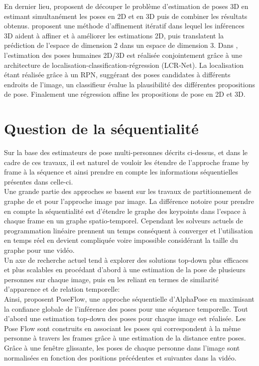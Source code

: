 En dernier lieu, \cite{simo2013joint} proposent de découper le problème d'estimation de poses 3D en estimant simultanément les poses en 2D et en 3D puis de combiner les résultats obtenus. \cite{tome2017lifting} proposent une méthode d'affinement itératif dans lequel les inférences 3D aident à affiner et à améliorer les estimations 2D, puis translatent la prédiction de l'espace de dimension 2 dans un espace de dimension 3. Dans \cite{rogez2019lcr}, l'estimation des poses humaines 2D/3D est réalisée conjointement grâce à une architecture de localisation-classification-régression (LCR-Net). La localisation étant réalisée grâce à un RPN, suggérant des poses candidates à différents endroits de l'image, un classifieur évalue la plausibilité des différentes propositions de pose. Finalement une régression affine les propositions de pose en 2D et 3D.

\section{Question de la séquentialité}
Sur la base des estimateurs de pose multi-personnes décrits ci-dessus, et dans le cadre de ces travaux, il est naturel de vouloir les étendre de l'approche frame by frame à la séquence et ainsi prendre en compte les informations séquentielles présentes dans celle-ci.\\

Une grande partie des approches se basent sur les travaux de partitionnement de graphe de \cite{2015arXiv151106645P} et \cite{2016arXiv160503170I} pour l'approche image par image. La différence notoire pour prendre en compte la séquentialité est d'étendre le graphe des keypoints dans l'espace à chaque frame en un graphe spatio-temporel. Cependant les solveurs actuels de programmation linéaire prennent un temps conséquent à converger et l'utilisation en temps réel en devient compliquée voire impossible considérant la taille du graphe pour une vidéo.\\

Un axe de recherche actuel tend à explorer des solutions top-down plus efficaces et plus scalables en procédant d'abord à une estimation de la pose de plusieurs personnes sur chaque image, puis en les reliant
en termes de similarité d'apparence et de relation temporelle:\\

Ainsi, \cite{2018arXiv180200977X} proposent PoseFlow, une approche séquentielle d'AlphaPose \cite{fang2017rmpe} en maximisant la confiance globale de l'inférence des poses pour une séquence temporelle. Tout d'abord une estimation top-down des poses pour chaque image est réalisée. Les Pose Flow sont construits en associant les poses qui correspondent à la même personne à travers les frames grâce à une estimation de la distance entre poses. Grâce à une fenêtre glissante, les poses de chaque personne dans l'image sont normalisées en fonction des positions précédentes et suivantes dans la vidéo.

